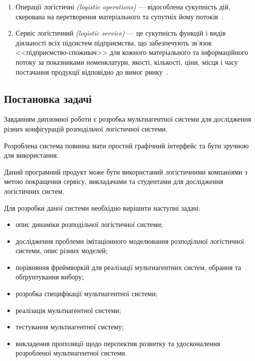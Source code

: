 \begin{enumerate}
    \item Операції логістичні \textit{(logistic operations)} --- відособлена сукупність дій, скерована на перетворення матеріального та супутніх йому потоків~\cite{Kusluy2010}.
    \item Сервіс логістичний \textit{(logistic service)} --- це сукупність функцій і видів діяльності всіх підсистем підприємства, що забезпечують зв’язок <<підприємство-споживач>> для кожного матеріального та інформаційного потоку за показниками номенклатури, якості, кількості, ціни, місця і часу постачання продукції відповідно до вимог ринку~\cite{Kusluy2010}.
\end{enumerate}

\subsection{Постановка задачі}
Завданням дипломної роботи є розробка мультиагентної системи для дослідження різних конфігурацій розподільчої логістичної системи.

Розроблена система повинна мати простий графічний інтерфейс та бути зручною для використання. 

Даний програмний продукт може бути використаний логістичними компаніями з метою покращення сервісу, викладачами та студентами для дослідження логістичних систем.

Для розробки даної системи необхідно вирішити наступні задачі:
\begin{itemize}
	\item опис динаміки розподільчої логістичної системи;
	\item дослідження проблеми імітаціонного моделювання розподільчої логістичної системи, опис різних моделей;
	\item порівняння фреймворкій для реалізації мультиагентних систем, обрання та обґрунтування вибору;
	\item розробка специфікації мультиагентної системи;
	\item реалізація мультиагентної системи;
	\item тестування мультиагентної систему;
	\item викладення пропозиції щодо перспектив розвитку та удосконалення розробленої мультиагентної системи.
\end{itemize}
